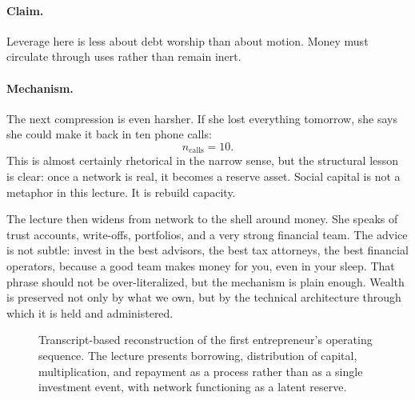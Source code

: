 \paragraph{Claim.}
Leverage here is less about debt worship than about motion. Money must circulate through uses rather than remain inert.

\paragraph{Mechanism.}
The next compression is even harsher. If she lost everything tomorrow, she says she could make it back in ten phone calls:
\begin{equation}
n_{\text{calls}} = 10.
\end{equation}
This is almost certainly rhetorical in the narrow sense, but the structural lesson is clear: once a network is real, it becomes a reserve asset. Social capital is not a metaphor in this lecture. It is rebuild capacity.

The lecture then widens from network to the shell around money. She speaks of trust accounts, write-offs, portfolios, and a very strong financial team. The advice is not subtle: invest in the best advisors, the best tax attorneys, the best financial operators, because a good team makes money for you, even in your sleep. That phrase should not be over-literalized, but the mechanism is plain enough. Wealth is preserved not only by what we own, but by the technical architecture through which it is held and administered.

\begin{figure}[h]
\centering
{}
\caption{Transcript-based reconstruction of the first entrepreneur's operating sequence. The lecture presents borrowing, distribution of capital, multiplication, and repayment as a process rather than as a single investment event, with network functioning as a latent reserve.}
\end{figure}


